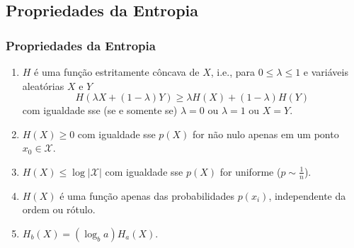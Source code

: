 \subsection{Propriedades da Entropia}
\begin{frame}%
  \frametitle{Propriedades da Entropia}
  \begin{enumerate}
    \item $H$ é uma função estritamente côncava de $X$, i.e., para $0 \leq \lambda \leq 1$
      e variáveis aleatórias $X$ e $Y$
      \begin{equation}
        H(\lambda X + (1 - \lambda) Y) \geq \lambda H(X) + (1 - \lambda) H(Y)
      \end{equation}
      com igualdade sse (se e somente se) $\lambda = 0$ ou $\lambda = 1$ ou $X=Y$.
    \item $H(X) \geq 0$ com igualdade sse $p(X)$ for não nulo apenas em um ponto $x_0 \in \mathcal{X}$.
    \item $H(X) \leq \log \vert \mathcal{X} \vert$ com igualdade sse $p(X)$ for uniforme ($p \sim \frac{1}{n}$).
    \item $H(X)$ é uma função apenas das probabilidades $p(x_i)$, independente da ordem ou rótulo.
    \item $H_b(X) = (\log_b a) H_a(X)$.
  \end{enumerate}
\end{frame}


